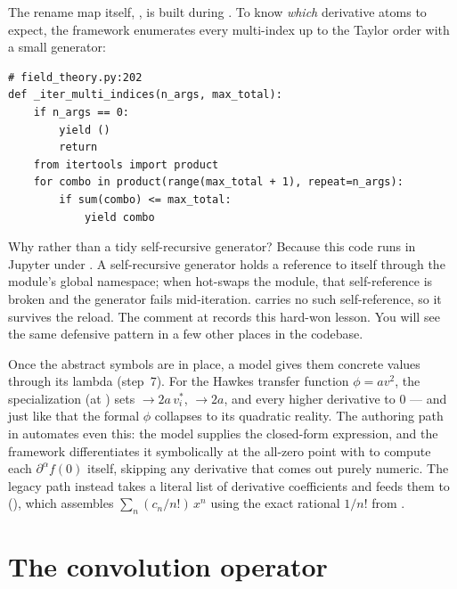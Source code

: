 The rename map itself, , is built during
. To know \emph{which} derivative atoms to expect, the
framework enumerates every multi-index up to the Taylor order with a small
generator:

\begin{lstlisting}
# field_theory.py:202
def _iter_multi_indices(n_args, max_total):
    if n_args == 0:
        yield ()
        return
    from itertools import product
    for combo in product(range(max_total + 1), repeat=n_args):
        if sum(combo) <= max_total:
            yield combo
\end{lstlisting}

\begin{note}
Why  rather than a tidy self-recursive generator? Because
this code runs in Jupyter under . A self-recursive generator
holds a reference to itself through the module's global namespace; when
 hot-swaps the module, that self-reference is broken and the
generator fails mid-iteration.  carries no such
self-reference, so it survives the reload. The comment at
 records this hard-won lesson. You will see the same
defensive pattern in a few other places in the codebase.
\end{note}

Once the abstract symbols are in place, a model gives them concrete values through
its  lambda (step~7). For the Hawkes transfer function
$\phi=a v^2$, the specialization (at ) sets
$\to 2a\,v^{*}_i$, $\to 2a$, and every higher
derivative to $0$ --- and just like that the formal $\phi$ collapses to its
quadratic reality. The  authoring path in
 automates even this: the model supplies the closed-form
expression, and the framework differentiates it symbolically at the all-zero point
with  to compute each $\partial^{\alpha}f(0)$ itself, skipping any
derivative that comes out purely numeric. The legacy  path
instead takes a literal list of derivative coefficients and feeds them to
 (), which assembles
$\sum_n (c_n/n!)\,x^n$ using the exact rational $1/n!$ from .

\section{The convolution operator}\label{sec:conv}

